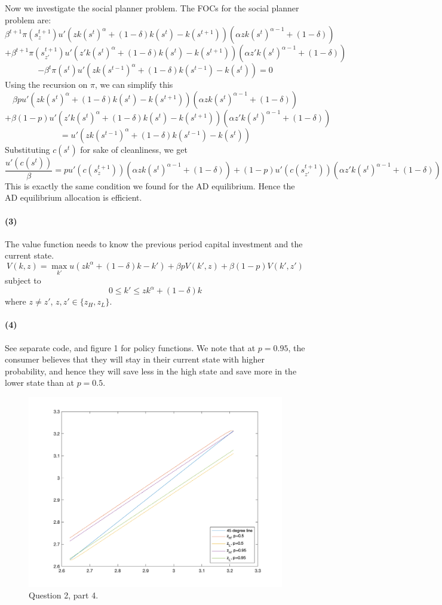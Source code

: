 \documentclass[10pt,letter]{article}
\newcommand{\problempart}[1]{\paragraph{#1}}
\begin{document}
Now we investigate the social planner problem. The FOCs for the social planner problem are:
\[ \beta^{t+1}\pi(s^{t+1}_{z})u'(z k(s^{t})^\alpha + (1-\delta)k(s^{t}) - k(s^{t+1}))(\alpha z k(s^t)^{\alpha - 1} + (1-\delta)) \] \[ + \beta^{t+1}\pi(s^{t+1}_{z'})u'(z' k(s^{t})^\alpha + (1-\delta)k(s^{t}) - k(s^{t+1}))(\alpha z' k(s^t)^{\alpha - 1} + (1-\delta)) \] \[  - \beta^t \pi(s^t) u'(z k(s^{t-1})^\alpha + (1-\delta)k(s^{t-1}) - k(s^t)) = 0 \]
Using the recursion on $\pi$, we can simplify this
\[ \beta pu'(z k(s^{t})^\alpha + (1-\delta)k(s^{t}) - k(s^{t+1}))(\alpha z k(s^t)^{\alpha - 1} + (1-\delta))   \]
\[ + \beta (1-p) u'(z' k(s^{t})^\alpha + (1-\delta)k(s^{t}) - k(s^{t+1}))(\alpha z' k(s^t)^{\alpha - 1} + (1-\delta)) \]
\[ =  u'(z k(s^{t-1})^\alpha + (1-\delta)k(s^{t-1}) - k(s^t)) \]
Substituting $c(s^t)$ for sake of cleanliness, we get
\[ \frac{u'(c(s^t))}{\beta} = pu'(c(s^{t+1}_z))(\alpha z k(s^t)^{\alpha - 1} + (1-\delta)) + (1-p)u'(c(s^{t+1}_{z'}))(\alpha z' k(s^t)^{\alpha - 1} + (1-\delta)) \]
This is exactly the same condition we found for the AD equilibrium. Hence the AD equilibrium allocation is efficient.
\problempart{(3)}
The value function needs to know the previous period capital investment and the current state.
\[ V(k, z) = \max_{k'} u(zk^{\alpha} + (1-\delta)k - k') + \beta p V(k', z) + \beta(1-p) V(k', z') \]
subject to
\[ 0 \le k' \le zk^{\alpha} + (1-\delta)k \]
where $z \neq z'$, $z, z' \in \{ z_H, z_L\}$.
\problempart{(4)} See separate code, and figure 1 for policy functions. We note that at $p=0.95$, the consumer believes that they will stay in their current state with higher probability, and hence they will save less in the high state and save more in the lower state than at $p=0.5$.
\begin{figure}
\centering
\includegraphics[scale=0.8]{ps5q2}
\caption{Question 2, part 4.}
\end{figure}
\end{document}
